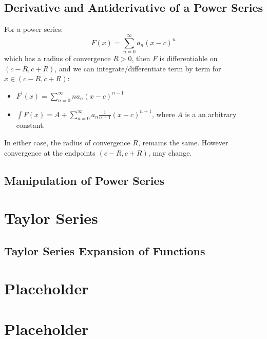 \documentclass[a4paper]{article}
\begin{document}
  \subsection{Derivative and Antiderivative of a Power Series}
  For a power series:
  \[
    F(x) = \sum_{n=0}^\infty a_n (x-c)^n
  \]
  which has a radius of convergence $R>0$, then $F$ is differentiable on $(c-R, c+R)$, and we can integrate/differentiate term by term for $x \in (c-R,c+R)$:
  \begin{itemize}
    \item $F^\prime (x) = \sum_{n=0}^\infty n a_n(x-c)^{n-1}$
    \item $\int F (x) = A + \sum_{n=0}^\infty a_n \displaystyle\frac{1}{n+1}(x-c)^{n+1}$, where $A$ is a an arbitrary constant.
  \end{itemize}
  In either case, the radius of convergence $R$, remains the same. However convergence at the endpoints $(c-R, c+R)$, may change.
  \subsection{Manipulation of Power Series}
  \section{Taylor Series} 
  \subsection{Taylor Series Expansion of Functions}
  \section{Placeholder} 
  \section{Placeholder} 
\end{document}
